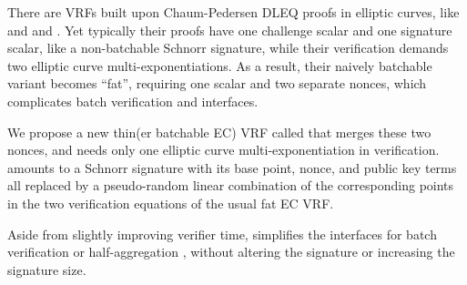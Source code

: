 

There are VRFs built upon Chaum-Pedersen DLEQ proofs in elliptic curves,
like \cite{nsec5} and \cite{VXEd25519} and \cite{draft-irtf-cfrg-vrf-10}.
Yet typically their proofs have one challenge scalar and one signature
scalar, like a non-batchable Schnorr signature, while
their verification demands two elliptic curve multi-exponentiations.
As a result, their naively batchable variant becomes ``fat'', requiring
one scalar and two separate nonces, which complicates batch verification
and interfaces.

We propose a new thin(er batchable EC) VRF called \ThinVRF that merges
these two nonces, and needs only one elliptic curve multi-exponentiation
in verification.  \ThinVRF amounts to a Schnorr signature with its
base point, nonce, and public key terms all replaced by a pseudo-random
linear combination of the corresponding points in the two verification
equations of the usual fat EC VRF.

Aside from slightly improving verifier time, \ThinVRF simplifies
the interfaces for batch verification or half-aggregation \cite{???},
without altering the signature or increasing the signature size.

